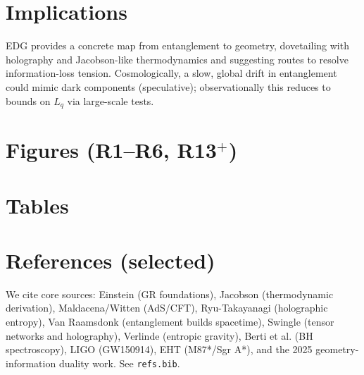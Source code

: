\documentclass[11pt]{article}
\begin{document}
\section{Implications}
EDG provides a concrete map from entanglement to geometry, dovetailing with holography and Jacobson-like thermodynamics and suggesting routes to resolve information-loss tension. Cosmologically, a slow, global drift in entanglement could mimic dark components (speculative); observationally this reduces to bounds on $L_q$ via large-scale tests.

\section*{Figures (R1--R6, R13$^{+}$)}

\section*{Tables}





\section*{References (selected)}
We cite core sources: Einstein (GR foundations), Jacobson (thermodynamic derivation), Maldacena/Witten (AdS/CFT), Ryu-Takayanagi (holographic entropy), Van Raamsdonk (entanglement builds spacetime), Swingle (tensor networks and holography), Verlinde (entropic gravity), Berti et al. (BH spectroscopy), LIGO (GW150914), EHT (M87*/Sgr A*), and the 2025 geometry-information duality work. See \texttt{refs.bib}.




\end{document}
